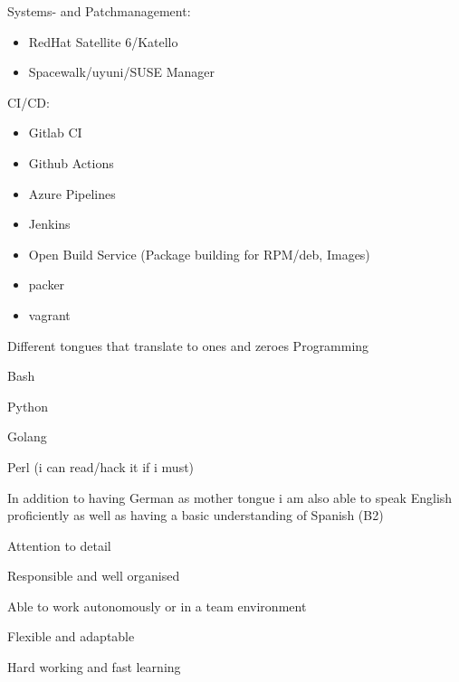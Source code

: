 \begin{cventries}
{\begin{cvitems}
\begin{itemize}
          \end{itemize}
        \item Systems- and Patchmanagement:
        \begin{itemize}
          \item RedHat Satellite 6/Katello
          \item Spacewalk/uyuni/SUSE Manager
        \end{itemize}
      \item CI/CD:
        \begin{itemize}
          \item Gitlab CI
          \item Github Actions
          \item Azure Pipelines
          \item Jenkins
          \item Open Build Service (Package building for RPM/deb, Images)
          \item packer
          \item vagrant
        \end{itemize}
      \end{cvitems}
    }

  \cventry
    {Different tongues that translate to ones and zeroes}
    {Programming}
    {}
    {}
    {
      \begin{cvitems}
        \item Bash
        \item Python
        \item Golang
        \item Perl (i can read/hack it if i must)
      \end{cvitems}
    }

\end{cventries}


\begin{cvparagraph}
In addition to having German as mother tongue i am also able to speak English proficiently as well
  as having a basic understanding of Spanish (B2)
\end{cvparagraph}

\newline

\begin{cvparagraph}

\begin{cvitems}
  \item Attention to detail
  \item Responsible and well organised
  \item Able to work autonomously or in a team environment
  \item Flexible and adaptable
  \item Hard working and fast learning
\end{cvitems}
\end{cvparagraph}



